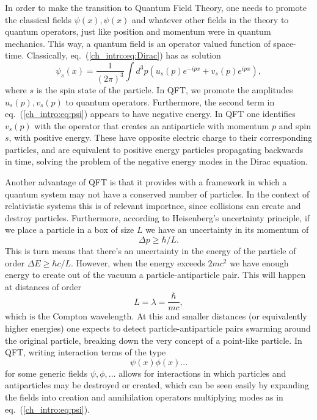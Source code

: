 In order to make the transition to Quantum Field Theory, one needs to promote the classical fields $\psi(x),\psi(x)$ and whatever other fields in the theory to quantum operators, just like position and momentum were in quantum mechanics. This way, a quantum field is an operator valued function of space-time. Classically, eq.~(\ref{ch_intro:eq:Dirac}) has as solution
\begin{equation}
\label{ch_intro:eq:psi}
\psi_s(x)=\frac{1}{(2\pi)^3}\int d^3p\left(u_s(p)e^{-ipx}+v_s(p)e^{ipx}\right),
\end{equation}
where $s$ is the spin state of the particle. In QFT, we promote the amplitudes $u_s(p),v_s(p)$ to quantum operators. Furthermore, the second term in eq.~(\ref{ch_intro:eq:psi}) appears to have negative energy. In QFT one identifies $v_s(p)$ with the operator that creates an antiparticle with momentum $p$ and spin $s$, with positive energy. These have opposite electric charge to their corresponding particles, and are equivalent to positive energy particles propagating backwards in time, solving the problem of the negative energy modes in the Dirac equation.

Another advantage of QFT is that it provides with a framework in which a quantum system may not have a conserved number of particles. In the context of relativistic systems this is of relevant importnce, since collisions can create and destroy particles. Furthermore, according to Heisenberg's uncertainty principle, if we place a particle in a box of size $L$ we have an uncertainty in its momentum of
\begin{equation}
\Delta p\geq\hbar/L.
\end{equation}
This is turn means that there's an uncertainty in the energy of the particle of order $\Delta E\geq\hbar c/L$. However, when the energy exceeds $2mc^2$ we have enough energy to create out of the vacuum a particle-antiparticle pair. This will happen at distances of order 
\begin{equation}
L=\lambda=\frac{\hbar}{mc},
\end{equation}
which is the Compton wavelength. At this and smaller distances (or equivalently higher energies) one expects to detect particle-antiparticle pairs swarming around the original particle, breaking down the very concept of a point-like particle. In QFT, writing interaction terms of the type
\begin{equation}
\psi(x)\phi(x)...
\end{equation}
for some generic fields $\psi,\phi,...$ allows for interactions in which particles and antiparticles may be destroyed or created, which can be seen easily by expanding the fields into creation and annihilation operators multiplying modes as in eq.~(\ref{ch_intro:eq:psi}).

